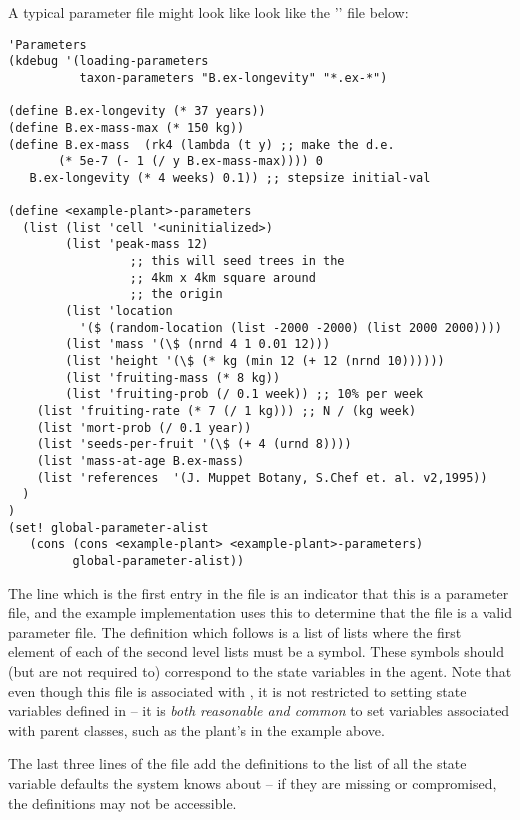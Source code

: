 A typical parameter file might look
like look like the '' file below:
\label{parameters}\label{kdebug}
\begin{verbatim}
'Parameters
(kdebug '(loading-parameters 
          taxon-parameters "B.ex-longevity" "*.ex-*") 

(define B.ex-longevity (* 37 years))
(define B.ex-mass-max (* 150 kg))
(define B.ex-mass  (rk4 (lambda (t y) ;; make the d.e.
       (* 5e-7 (- 1 (/ y B.ex-mass-max)))) 0
   B.ex-longevity (* 4 weeks) 0.1)) ;; stepsize initial-val

(define <example-plant>-parameters
  (list (list 'cell '<uninitialized>)
        (list 'peak-mass 12)
                 ;; this will seed trees in the
                 ;; 4km x 4km square around
                 ;; the origin
        (list 'location 
          '($ (random-location (list -2000 -2000) (list 2000 2000))))
        (list 'mass '(\$ (nrnd 4 1 0.01 12)))
        (list 'height '(\$ (* kg (min 12 (+ 12 (nrnd 10))))))
        (list 'fruiting-mass (* 8 kg))
        (list 'fruiting-prob (/ 0.1 week)) ;; 10% per week
    (list 'fruiting-rate (* 7 (/ 1 kg))) ;; N / (kg week)
    (list 'mort-prob (/ 0.1 year))
    (list 'seeds-per-fruit '(\$ (+ 4 (urnd 8))))
    (list 'mass-at-age B.ex-mass)
    (list 'references  '(J. Muppet Botany, S.Chef et. al. v2,1995))
  )
)
(set! global-parameter-alist 
   (cons (cons <example-plant> <example-plant>-parameters) 
         global-parameter-alist))
\end{verbatim}

The  line which is the first entry in the file is
an indicator that this is a parameter file, and the example implementation 
uses this to determine that the file is a valid parameter file.
The definition which follows is a list of lists where the first
element of each of the second level lists must be a symbol.  These
symbols should (but are not required to) correspond to the state
variables in the agent. Note that even though this file is associated
with , it is not restricted to setting state
variables defined in  -- it is \emph{both reasonable
  and common} to set variables associated with parent classes, such as
the plant's  in the example above.

The last three lines of the file add the definitions to the list of
all the state variable defaults the system knows about -- if they are
missing or compromised, the definitions may not be accessible.


